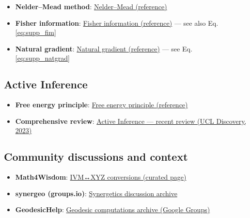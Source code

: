 \documentclass[
  10pt,
]{article}
\providecommand{\tightlist}{%
  \setlength{\itemsep}{0pt}\setlength{\parskip}{0pt}}
\begin{document}
\begin{itemize}
\tightlist
\item
  \textbf{Nelder--Mead method}:
  \href{https://en.wikipedia.org/wiki/Nelder\%E2\%80\%93Mead_method}{Nelder--Mead
  (reference)}
\item
  \textbf{Fisher information}:
  \href{https://en.wikipedia.org/wiki/Fisher_information}{Fisher
  information (reference)} --- see also Eq. \eqref{eq:supp_fim}
\item
  \textbf{Natural gradient}:
  \href{https://en.wikipedia.org/wiki/Natural_gradient}{Natural gradient
  (reference)} --- see Eq. \eqref{eq:supp_natgrad}
\end{itemize}

\hypertarget{active-inference}{%
\subsection{Active Inference}\label{active-inference}}

\begin{itemize}
\tightlist
\item
  \textbf{Free energy principle}:
  \href{https://en.wikipedia.org/wiki/Free_energy_principle}{Free energy
  principle (reference)}
\item
  \textbf{Comprehensive review}:
  \href{https://discovery.ucl.ac.uk/id/eprint/10176959/1/1-s2.0-S1571064523001094-main.pdf}{Active
  Inference --- recent review (UCL Discovery, 2023)}
\end{itemize}

\hypertarget{community-discussions-and-context}{%
\subsection{Community discussions and
context}\label{community-discussions-and-context}}

\begin{itemize}
\tightlist
\item
  \textbf{Math4Wisdom}:
  \href{https://coda.io/@daniel-ari-friedman/math4wisdom/ivm-xyz-40}{IVM↔XYZ
  conversions (curated page)}
\item
  \textbf{synergeo (groups.io)}:
  \href{https://groups.io/g/synergeo/topics}{Synergetics discussion
  archive}
\item
  \textbf{GeodesicHelp}:
  \href{https://groups.google.com/g/GeodesicHelp/}{Geodesic computations
  archive (Google Groups)}
\end{itemize}
\end{document}
